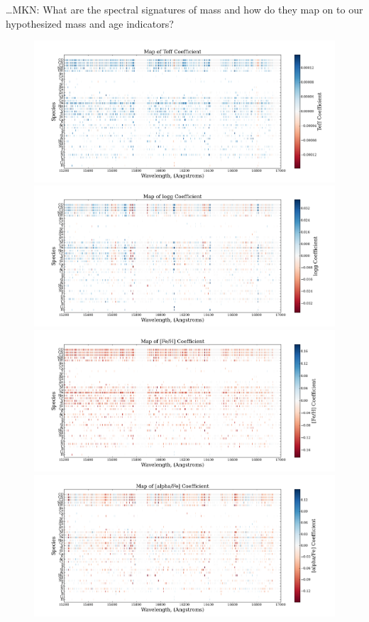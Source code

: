 \documentclass[12pt, preprint]{aastex}
\begin{document}
\ldots MKN: What are the spectral signatures of mass and how do they
map on to our hypothesized mass and age indicators?

\begin{figure}[p!]
\centering
  \includegraphics[scale=0.21]{./plots/teff_coefficient.png}
  \includegraphics[scale=0.21]{./plots/logg_coefficient.png}
  \includegraphics[scale=0.21]{./plots/feh_coefficient.png}
  \includegraphics[scale=0.21]{./plots/alphafeh_coefficient.png}

\end{figure}
\end{document}
